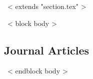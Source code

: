 ~< extends "section.tex" >~

~< block body >~
\nocite{*}

\renewcommand*{\bibfont}{\small}
\subsection{Journal Articles}
\printbibliography[heading=none,type=article,keyword=journal,resetnumbers=true]

~< endblock body >~
